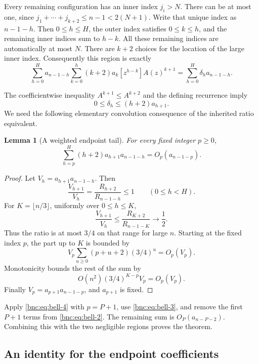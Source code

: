 \documentclass[11pt]{article}
\numberwithin{equation}{section}
\newtheorem{lemma}[theorem]{Lemma}
\theoremstyle{definition}
\theoremstyle{remark}
\begin{document}
Every remaining configuration has an inner index \(j_i>N\).
There can be at most one, since \(j_1+\cdots+j_{k+2}\le n-1<2(N+1)\).
Write that unique index as \(n-1-h\).
Then \(0\le h\le H\), the outer index satisfies \(0\le k\le h\),
and the remaining inner indices sum to \(h-k\).
All these remaining indices are automatically at most \(N\).
There are \(k+2\) choices for the location of the large inner index.
Consequently this region is exactly
\begin{equation}\label{bnc:eq:bell-2}
\sum_{h=0}^{H}a_{n-1-h}
       \sum_{k=0}^{h}(k+2)a_k[z^{h-k}]A(z)^{k+1}
 =\sum_{h=0}^{H}\delta_h a_{n-1-h}.
\end{equation}

The coefficientwise inequality \(A^{k+1}\le A^{k+2}\) and
the defining recurrence imply
\begin{equation}\label{bnc:eq:bell-3}
0\le \delta_h\le(h+2)a_{h+1}.
\end{equation}
We need the following elementary convolution consequence of the
inherited ratio equivalent.

\begin{lemma}[A weighted endpoint tail]\label{bnc:lem:endpointtail}
For every fixed integer \(p\ge0\),
\begin{equation}\label{bnc:eq:bell-4}
\sum_{h=p}^{H}(h+2)a_{h+1}a_{n-1-h}
       =O_p(a_{n-1-p}).
\end{equation}
\end{lemma}

\begin{proof}
Let \(V_h=a_{h+1}a_{n-1-h}\).
Then
\[
 \frac{V_{h+1}}{V_h}
      =\frac{R_{h+2}}{R_{n-1-h}}\le1
 \qquad(0\le h<H).
\]
For \(K=\lfloor n/3\rfloor\), uniformly over \(0\le h\le K\),
\[
 \frac{V_{h+1}}{V_h}
 \le \frac{R_{K+2}}{R_{n-1-K}}\longrightarrow\frac12.
\]
Thus the ratio is at most \(3/4\) on that range for large \(n\).
Starting at the fixed index \(p\), the part up to \(K\) is bounded by
\[
 V_p\sum_{u\ge0}(p+u+2)(3/4)^u=O_p(V_p).
\]
Monotonicity bounds the rest of the sum by
\[
O(n^2)(3/4)^{K-p}V_p=O_p(V_p).
\]
Finally \(V_p=a_{p+1}a_{n-1-p}\), and \(a_{p+1}\) is fixed.
\end{proof}

Apply \eqref{bnc:eq:bell-4} with \(p=P+1\), use \eqref{bnc:eq:bell-3}, and remove the first \(P+1\)
terms from \eqref{bnc:eq:bell-2}.  The remaining sum is \(O_P(a_{n-P-2})\).
Combining this with the two negligible regions proves the theorem.

\subsection{An identity for the endpoint coefficients}
\end{document}
